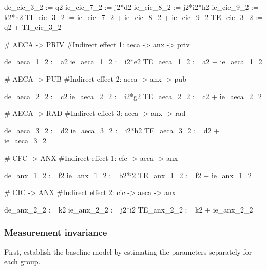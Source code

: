 \documentclass[
  letterpaper,
  DIV=11,
  numbers=noendperiod]{scrreprt}
\newenvironment{Shaded}{\begin{snugshade}}{\end{snugshade}}
\newcommand{\StringTok}[1]{\textcolor[rgb]{0.13,0.47,0.30}{#1}}
\begin{document}
\begin{Shaded}
\begin{Highlighting}[]
\StringTok{de\_cic\_3\_2 := q2}
\StringTok{ie\_cic\_7\_2 := j2*d2}
\StringTok{ie\_cic\_8\_2 := j2*i2*h2}
\StringTok{ie\_cic\_9\_2 := k2*h2}
\StringTok{TI\_cic\_3\_2 := ie\_cic\_7\_2 + ie\_cic\_8\_2 + ie\_cic\_9\_2}
\StringTok{TE\_cic\_3\_2 := q2 + TI\_cic\_3\_2}



\StringTok{\# AECA {-}\textgreater{} PRIV}
\StringTok{\#Indirect effect 1: aeca {-}\textgreater{} anx {-}\textgreater{} priv}

\StringTok{de\_aeca\_1\_2 := a2}
\StringTok{ie\_aeca\_1\_2 := i2*e2}
\StringTok{TE\_aeca\_1\_2 := a2 + ie\_aeca\_1\_2}

\StringTok{\# AECA {-}\textgreater{} PUB}
\StringTok{\#Indirect effect 2: aeca {-}\textgreater{} anx {-}\textgreater{} pub}

\StringTok{de\_aeca\_2\_2 := c2}
\StringTok{ie\_aeca\_2\_2 := i2*g2}
\StringTok{TE\_aeca\_2\_2 := c2 + ie\_aeca\_2\_2}

\StringTok{\# AECA {-}\textgreater{} RAD}
\StringTok{\#Indirect effect 3: aeca {-}\textgreater{} anx {-}\textgreater{} rad}

\StringTok{de\_aeca\_3\_2 := d2}
\StringTok{ie\_aeca\_3\_2 := i2*h2}
\StringTok{TE\_aeca\_3\_2 := d2 + ie\_aeca\_3\_2}


\StringTok{\# CFC {-}\textgreater{} ANX}
\StringTok{\#Indirect effect 1: cfc {-}\textgreater{} aeca {-}\textgreater{} anx}

\StringTok{de\_anx\_1\_2 := f2}
\StringTok{ie\_anx\_1\_2 := b2*i2}
\StringTok{TE\_anx\_1\_2 := f2 + ie\_anx\_1\_2}

\StringTok{\# CIC {-}\textgreater{} ANX}
\StringTok{\#Indirect effect 2: cic {-}\textgreater{} aeca {-}\textgreater{} anx}

\StringTok{de\_anx\_2\_2 := k2}
\StringTok{ie\_anx\_2\_2 := j2*i2}
\StringTok{TE\_anx\_2\_2 := k2 + ie\_anx\_2\_2}
\StringTok{\textquotesingle{}}
\end{Highlighting}
\end{Shaded}

\subsubsection{Measurement invariance}\label{measurement-invariance}

First, establish the baseline model by estimating the parameters
separately for each group.
\end{document}
